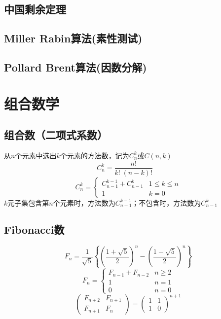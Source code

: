 \subsection{中国剩余定理}
\subsection{Miller Rabin算法(素性测试)}
\subsection{Pollard Brent算法(因数分解)}

\section{组合数学}
\subsection{组合数（二项式系数）}
从$n$个元素中选出$k$个元素的方法数，记为$C_{n}^{k}$或$C(n, k)$
\begin{displaymath}
C_n^k = \frac{n!}{k!\;(n-k)!} \quad
\end{displaymath}
\begin{displaymath}
C_{n}^{k} = 
\begin{cases}
C_{n-1}^{k-1} + C_{n-1}^{k} & 1 \leqslant k \leqslant n\\
1 & k=0
\end{cases}
\end{displaymath}
$k$元子集包含第$n$个元素时，方法数为$ C_{n-1}^{k-1}$；不包含时，方法数为$C_{n-1}^{k}$\\

\subsection{Fibonacci数}
\begin{displaymath}
F_{n} = \frac{1}{\sqrt{5}}\left\{\left(\frac{1+\sqrt{5}}{2}\right)^n - \left(\frac{1-\sqrt{5}}{2}\right)^n\right\}
\end{displaymath}
\begin{displaymath}
F_{n} = 
\begin{cases}
F_{n-1}+ F_{n-2} & n \geqslant 2\\
1 & n=1\\
0 & n=0
\end{cases}
\end{displaymath}
\begin{displaymath}
\begin{pmatrix} F_{n+2} & F_{n+1} \\ F_{n+1} & F_{n} \end{pmatrix}
=
\begin{pmatrix} 1 & 1 \\ 1 & 0 \end{pmatrix}^{n + 1}
\end{displaymath}

